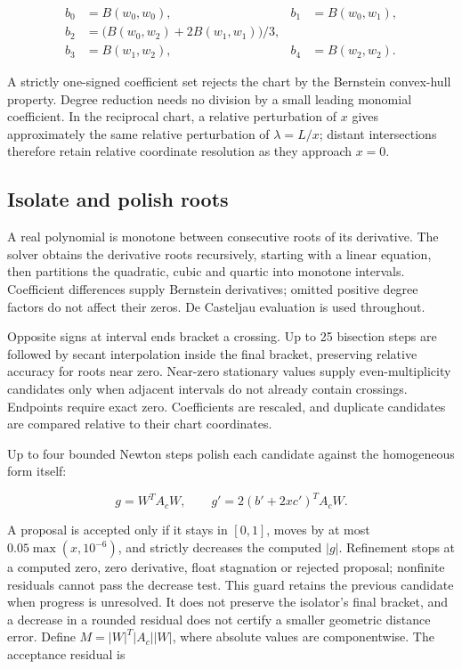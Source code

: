 \documentclass[11pt,a4paper]{article}
\begin{document}
\[
\begin{aligned}
b_0&=B(w_0,w_0), & b_1&=B(w_0,w_1),\\
b_2&=\bigl(B(w_0,w_2)+2B(w_1,w_1)\bigr)/3,\\
b_3&=B(w_1,w_2), & b_4&=B(w_2,w_2).
\end{aligned}
\]

A strictly one-signed coefficient set rejects the chart by the Bernstein
convex-hull property. Degree reduction needs no division by a small
leading monomial coefficient. In the reciprocal chart, a relative
perturbation of \(x\) gives approximately the same relative perturbation
of \(\lambda=L/x\); distant intersections therefore retain relative
coordinate resolution as they approach \(x=0\).

\subsection{Isolate and polish roots}\label{isolate-and-polish-roots}

A real polynomial is monotone between consecutive roots of its
derivative. The solver obtains the derivative roots recursively,
starting with a linear equation, then partitions the quadratic, cubic
and quartic into monotone intervals. Coefficient differences supply
Bernstein derivatives; omitted positive degree factors do not affect
their zeros. De Casteljau evaluation is used throughout.

Opposite signs at interval ends bracket a crossing. Up to 25 bisection
steps are followed by secant interpolation inside the final bracket,
preserving relative accuracy for roots near zero. Near-zero stationary
values supply even-multiplicity candidates only when adjacent intervals
do not already contain crossings. Endpoints require exact zero.
Coefficients are rescaled, and duplicate candidates are compared
relative to their chart coordinates.

Up to four bounded Newton steps polish each candidate against the
homogeneous form itself:

\[
g=W^TA_cW,\qquad g'=2(b'+2xc')^TA_cW.
\]

A proposal is accepted only if it stays in \([0,1]\), moves by at most
\(0.05\max(x,10^{-6})\), and strictly decreases the computed \(|g|\).
Refinement stops at a computed zero, zero derivative, float stagnation
or rejected proposal; nonfinite residuals cannot pass the decrease test.
This guard retains the previous candidate when progress is unresolved.
It does not preserve the isolator's final bracket, and a decrease in a
rounded residual does not certify a smaller geometric distance error.
Define \(M=|W|^T|A_c||W|\), where absolute values are componentwise. The
acceptance residual is
\end{document}

